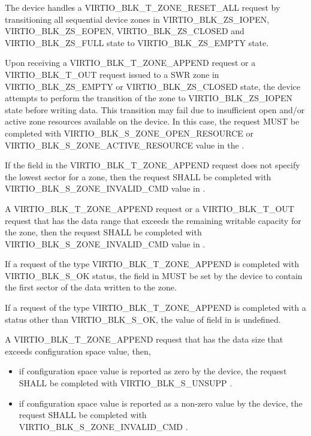 The device handles a VIRTIO_BLK_T_ZONE_RESET_ALL request by transitioning all
sequential device zones in VIRTIO_BLK_ZS_IOPEN, VIRTIO_BLK_ZS_EOPEN,
VIRTIO_BLK_ZS_CLOSED and VIRTIO_BLK_ZS_FULL state to VIRTIO_BLK_ZS_EMPTY state.

Upon receiving a VIRTIO_BLK_T_ZONE_APPEND request or a VIRTIO_BLK_T_OUT
request issued to a SWR zone in VIRTIO_BLK_ZS_EMPTY or VIRTIO_BLK_ZS_CLOSED
state, the device attempts to perform the transition of the zone to
VIRTIO_BLK_ZS_IOPEN state before writing data. This transition may fail due to
insufficient open and/or active zone resources available on the device. In this
case, the request MUST be completed with VIRTIO_BLK_S_ZONE_OPEN_RESOURCE or
VIRTIO_BLK_S_ZONE_ACTIVE_RESOURCE value in the .

If the  field in the VIRTIO_BLK_T_ZONE_APPEND request does not
specify the lowest sector for a zone, then the request SHALL be completed with
VIRTIO_BLK_S_ZONE_INVALID_CMD value in .

A VIRTIO_BLK_T_ZONE_APPEND request or a VIRTIO_BLK_T_OUT request that has the
data range that exceeds the remaining writable capacity for the zone, then the
request SHALL be completed with VIRTIO_BLK_S_ZONE_INVALID_CMD value in
.

If a request of the type VIRTIO_BLK_T_ZONE_APPEND is completed with
VIRTIO_BLK_S_OK status, the field  in
 MUST be set by the device to contain the first sector
of the data written to the zone.

If a request of the type VIRTIO_BLK_T_ZONE_APPEND is completed with a status
other than VIRTIO_BLK_S_OK, the value of  field in
 is undefined.

A VIRTIO_BLK_T_ZONE_APPEND request that has the data size that exceeds
 configuration space value, then,
\begin{itemize}
\item if  configuration space value is reported as
    zero by the device, the request SHALL be completed with VIRTIO_BLK_S_UNSUPP
    .

\item if  configuration space value is reported as
    a non-zero value by the device, the request SHALL be completed with
    VIRTIO_BLK_S_ZONE_INVALID_CMD .
\end{itemize}

